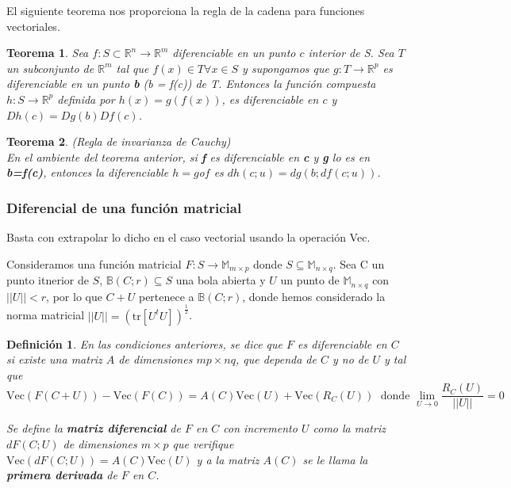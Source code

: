 \documentclass{article}
\theoremstyle{theorem-style}  %
\newtheorem{theorem}{Teorema}[section]  %
\theoremstyle{definition}
\newtheorem{definition}{Definición}[section]
\theoremstyle{example-style}
\begin{document}
El siguiente teorema nos proporciona la regla de la cadena para funciones vectoriales.

\begin{theorem}
	Sea $f: S\subset \mathbb{R}^n \rightarrow \mathbb{R}^m$ diferenciable en un punto $c$ interior de S. Sea $T$ un subconjunto de $\mathbb{R}^m$ tal que $f(x) \in T \forall x \in S$ y supongamos que $g: T \rightarrow \mathbb{R}^p$ es diferenciable en un punto \textbf{b} (b = f(c)) de T. Entonces la función compuesta $h: S \rightarrow \mathbb{R}^p$ definida por $h(x)=g(f(x))$, es diferenciable en $c$ y $Dh(c)=Dg(b)Df(c)$.
\end{theorem}

\begin{theorem} (Regla de invarianza de Cauchy) \\
	En el ambiente del teorema anterior, si \textbf{f} es diferenciable en \textbf{c} y \textbf{g} lo es en \textbf{b=f(c)}, entonces la diferenciable $h=g$o$f$ es $dh(c;u) = dg(b;df(c;u))$.   
	
\end{theorem}

\subsubsection{Diferencial de una función matricial}

Basta con extrapolar lo dicho en el caso vectorial usando la operación Vec.

Consideramos una función matricial $F: S \rightarrow \mathbb{M}_{m\times p}$ donde $S \subseteq \mathbb{M}_{n\times q}$. Sea C un punto itnerior de $S$, $\mathbb{B}(C;r) \subseteq S$ una bola abierta y $U$ un punto de $\mathbb{M}_{n\times q}$ con $||U||<r$, por lo que $C+U$ pertenece a $\mathbb{B}(C;r)$, donde hemos considerado la norma matricial $||U||=(\text{tr}[U^tU])^{\frac{1}{2}}$.

\begin{definition}
\textit{	En las condiciones anteriores, se dice que $F$ es diferenciable en $C$ si existe una matriz $A$ de dimensiones $mp\times nq$, que dependa de $C$ y no de $U$ y tal que}
	$$\text{Vec}(F(C+U))-\text{Vec}(F(C))=A(C)\text{Vec}(U)+\text{Vec}(R_C(U))\; \text{ donde } \lim\limits_{U\rightarrow 0} \frac{R_C(U)}{||U||} = 0$$
	
	\textit{Se define la \textbf{matriz diferencial} de $F$ en $C$ con incremento $U$ como la matriz $dF(C;U)$ de dimensiones $m\times p$ que verifique $\text{Vec}(dF(C;U))=A(C)\text{Vec}(U)$ y a la matriz $A(C)$ se le llama la \textbf{primera derivada} de $F$ en $C$.}
\end{definition}
\end{document}
